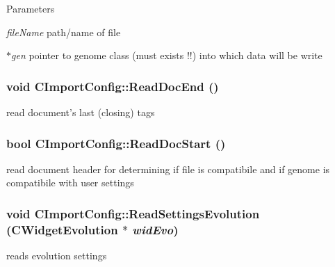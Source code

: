 \begin{DoxyParams}{Parameters}
\item[{\em fileName}]path/name of file \item[{\em $\ast$gen}]pointer to genome class (must exists !!) into which data will be write \end{DoxyParams}
\hypertarget{classCImportConfig_a0b08262d21fcf9995846c599bac9357c}{
\subsubsection[{ReadDocEnd}]{\setlength{\rightskip}{0pt plus 5cm}void CImportConfig::ReadDocEnd ()}}
\label{classCImportConfig_a0b08262d21fcf9995846c599bac9357c}
read document's last (closing) tags \hypertarget{classCImportConfig_a0397bcf324cc2938b413bfb9670e05a4}{
\subsubsection[{ReadDocStart}]{\setlength{\rightskip}{0pt plus 5cm}bool CImportConfig::ReadDocStart ()}}
\label{classCImportConfig_a0397bcf324cc2938b413bfb9670e05a4}
read document header for determining if file is compatibile and if genome is compatibile with user settings \hypertarget{classCImportConfig_abf7928fbebdd79cf6334fd0c9c2975bc}{
\subsubsection[{ReadSettingsEvolution}]{\setlength{\rightskip}{0pt plus 5cm}void CImportConfig::ReadSettingsEvolution ({\bf CWidgetEvolution} $\ast$ {\em widEvo})}}
\label{classCImportConfig_abf7928fbebdd79cf6334fd0c9c2975bc}
reads evolution settings


